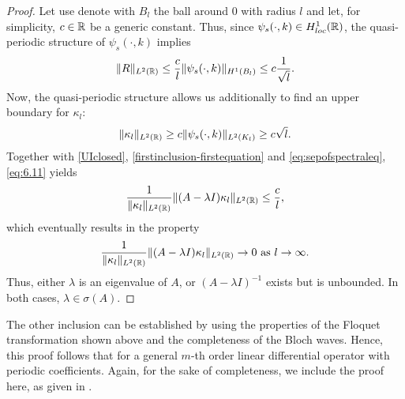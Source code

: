 \begin{theorem}
\begin{proof}
		Let use denote with $B_{l}$ the ball around $0$ with radius $l$ and let, for simplicity, $c \in \mathbb{R}$ be a generic constant. Thus, since $\psi_{s}(\cdot, k) \in H^{1}_{loc}(\mathbb{R})$, the quasi-periodic structure of $\psi_{s}(\cdot, k)$ implies
		\begin{equation}
			 \| R \|_{L^{2}(\mathbb{R})} \leq \frac{c}{l} \| \psi_{s}(\cdot, k) \|_{H^{1}(B_{l})} \leq c \frac{1}{\sqrt{l}}. \label{eq:estimofR}
		\end{equation}
		Now, the quasi-periodic structure allows us additionally to find an upper boundary for $\kappa_{l}$:
		\begin{equation}
			\| \kappa_{l} \|_{L^{2}(\mathbb{R})} \geq c \| \psi_{s}(\cdot, k) \|_{L^{2}(K_{l})} \geq c \sqrt{l}. \label{eq:6.11}
		\end{equation} 
		Together with \eqref{UIclosed}, \eqref{firstinclusion-firstequation} and \eqref{eq:sepofspectraleq}, \eqref{eq:6.11} yields
		\[ \frac{1}{\|\kappa_{l}\|_{L^{2}(\mathbb{R})}}\| (A - \lambda I) \kappa_{l} \|_{L^{2}(\mathbb{R})} \leq \frac{c}{l}, \]
		which eventually results in the property
			\[ \frac{1}{\|\kappa_{l} \|_{L^{2}(\mathbb{R})}} \| (A - \lambda I) \kappa_{l} \|_{L^{2}(\mathbb{R})} \rightarrow 0 \text{ as } l \rightarrow \infty. \]
		Thus, either $\lambda$ is an eigenvalue of $A$, or $(A - \lambda I)^{-1}$ exists but is unbounded. In both cases, $\lambda \in \sigma(A)$.
	\end{proof}
\end{theorem}	

The other inclusion can be established by using the properties of the Floquet transformation shown above and the completeness of the Bloch waves. Hence, this proof follows that for a general $m$-th order linear differential operator with periodic coefficients. Again, for the sake of completeness, we include the proof here, as given in \cite[Section 3.6]{dorfler2011photonic}.

